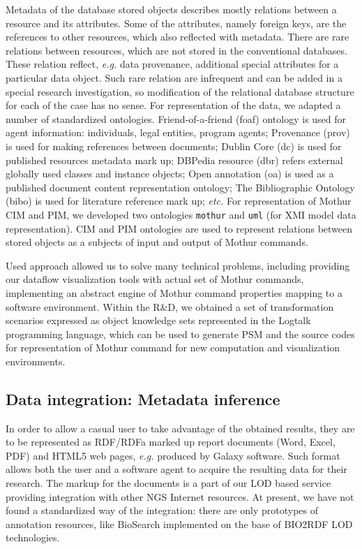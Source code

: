 \documentclass[a4paper]{jpconf}
\begin{document}

Metadata of the database stored objects describes mostly relations between a resource and its attributes.  Some of the attributes, namely foreign keys, are the references to other resources, which also reflected with metadata.  There are rare relations between resources, which are not stored in the conventional databases.  These relation reflect, \emph{e.g.} data provenance, additional special attributes for a particular data object.  Such rare relation are infrequent and can be added in a special research investigation, so modification of the relational database structure for each of the case has no sense. For representation of the data, we adapted a number of standardized ontologies. Friend-of-a-friend (foaf) ontology is used for agent information: individuals, legal entities, program agents; Provenance (prov) is used for making references between documents; Dublin Core (dc) is used for published resources metadata mark up; DBPedia resource ({dbr}) refers external globally used classes and instance objects; Open annotation ({oa}) is used as a published document content representation ontology; The Bibliographic Ontology ({bibo}) is used for literature reference mark up; \emph{etc.} For representation of Mothur CIM and PIM, we developed two ontologies \texttt{mothur} and \texttt{uml} (for XMI model data representation).  CIM and PIM ontologies are used to represent relations between stored objects as a subjects of input and output of Mothur commands.

Used approach allowed us to solve many technical problems, including providing our dataflow visualization tools with actual set of Mothur commands, implementing an abstract engine of Mothur command properties mapping to a software environment. Within the R\&D, we obtained a set of transformation scenarios expressed as object knowledge sets represented in the Logtalk \cite{logtalk} programming language, which can be used to generate PSM and the source codes for representation of Mothur command for new computation and visualization environments.

\subsection{Data integration: Metadata inference}

In order to allow a casual user to take advantage of the obtained results, they are to be represented as RDF/RDFa marked up report documents (Word, Excel, PDF) and HTML5 web pages, \emph{e.g.} produced by Galaxy software.  Such format allows both the user and a software agent to acquire the resulting data for their research.  The markup for the documents is a part of our LOD based service providing integration with other NGS Internet resources.  At present, we have not found a standardized way of the integration: there are only prototypes of annotation resources, like BioSearch \cite{biosearch} implemented on the base of BIO2RDF LOD technologies.
\end{document}
